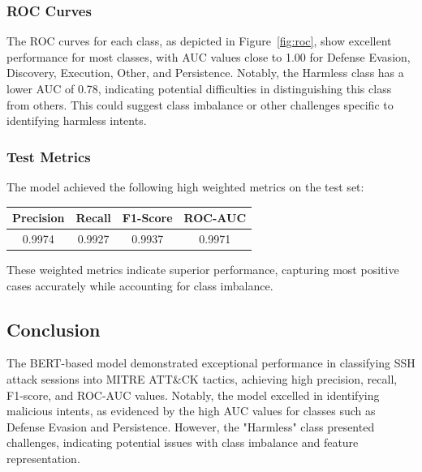         \subsubsection{ROC Curves \\}

            The ROC curves for each class, as depicted in Figure~\ref{fig:roc}, show excellent performance for most classes, with AUC values close to 1.00 for Defense Evasion, Discovery, Execution, Other, and Persistence. Notably, the Harmless class has a lower AUC of 0.78, indicating potential difficulties in distinguishing this class from others. This could suggest class imbalance or other challenges specific to identifying harmless intents.
            
        \subsubsection{Test Metrics \\}
        
            The model achieved the following high weighted metrics on the test set:
            \vspace{-0.2cm}
            \begin{table}[h]
                \centering
                \begin{tabular}{|c|c|c|c|}
                    \hline
                    \textbf{Precision} & \textbf{Recall} & \textbf{F1-Score} & \textbf{ROC-AUC} \\
                    \hline
                    0.9974 & 0.9927 & 0.9937 & 0.9971 \\
                    \hline
                \end{tabular}
            \end{table}
            \vspace{-0.2cm}
            
            These weighted metrics indicate superior performance, capturing most positive cases accurately while accounting for class imbalance. 
            
    \subsection{Conclusion}

        The BERT-based model demonstrated exceptional performance in classifying SSH attack sessions into MITRE ATT\&CK tactics, achieving high precision, recall, F1-score, and ROC-AUC values. Notably, the model excelled in identifying malicious intents, as evidenced by the high AUC values for classes such as Defense Evasion and Persistence. However, the "Harmless" class presented challenges, indicating potential issues with class imbalance and feature representation.

